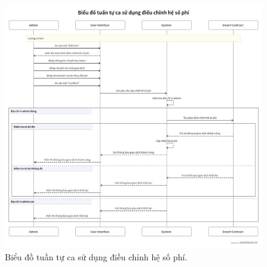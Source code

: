 \begin{figure}[H]
    \centering
    \includegraphics[width=1\textwidth]{figures/c2/ChangeFeeSeq.png}
    \caption{Biểu đồ tuần tự ca sử dụng điều chỉnh hệ số phí.}
    \label{fig:architecture-diagram}
\end{figure}

